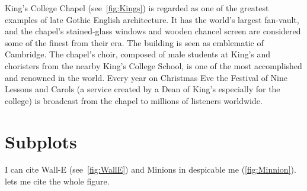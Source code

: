 \documentclass{report}
\begin{document}

King's College Chapel (see~\cref{fig:Kings}) is regarded as one of the 
greatest examples of late Gothic English architecture. It has the world's 
largest fan-vault, and the chapel's stained-glass windows and wooden chancel 
screen are considered some of the finest from their era. The building is seen 
as emblematic of Cambridge. The chapel's choir, composed of male students at 
King's and choristers from the nearby King's College School, is one of the most 
accomplished and renowned in the world. Every year on Christmas Eve the 
Festival of Nine Lessons and Carols (a service created by a Dean of King's 
especially for the college) is broadcast from the chapel to millions of 
listeners worldwide.


\section*{Subplots}

I can cite Wall-E (see~\cref{fig:WallE}) and Minions in despicable me 
(\cref{fig:Minnion}).~ lets me cite the whole figure.

\end{document}

